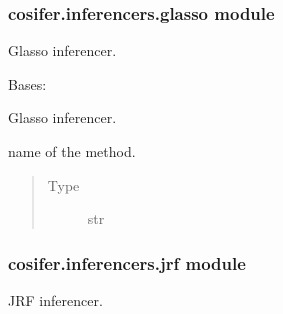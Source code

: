 \documentclass[letterpaper,10pt,english]{sphinxmanual}
\begin{document}
\subsubsection{cosifer.inferencers.glasso module}
\label{\detokenize{_modules/cosifer.inferencers:module-cosifer.inferencers.glasso}}\label{\detokenize{_modules/cosifer.inferencers:cosifer-inferencers-glasso-module}}
Glasso inferencer.

\begin{fulllineitems}
\label{\detokenize{_modules/cosifer.inferencers:cosifer.inferencers.glasso.Glasso}}
Bases: {\hyperref[\detokenize{_modules/cosifer.inferencers:cosifer.inferencers.network_inferencer.NetworkInferencer}]{}}

Glasso inferencer.

\begin{fulllineitems}
\label{\detokenize{_modules/cosifer.inferencers:cosifer.inferencers.glasso.Glasso.method}}
name of the method.
\begin{quote}\begin{description}
\item[{Type}] \leavevmode
str

\end{description}\end{quote}

\end{fulllineitems}


\end{fulllineitems}



\subsubsection{cosifer.inferencers.jrf module}
\label{\detokenize{_modules/cosifer.inferencers:module-cosifer.inferencers.jrf}}\label{\detokenize{_modules/cosifer.inferencers:cosifer-inferencers-jrf-module}}
JRF inferencer.
\end{document}

